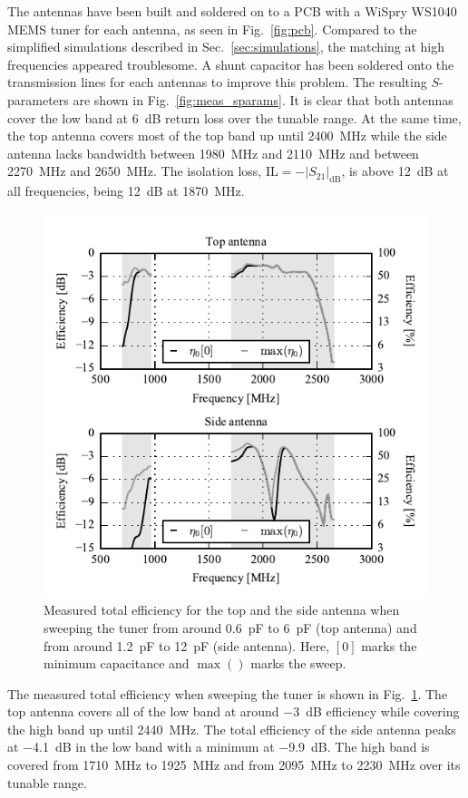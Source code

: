 The antennas have been built and soldered on to a PCB with a WiSpry WS1040 MEMS tuner for each antenna, as seen in Fig.~\ref{fig:pcb}. Compared to the simplified simulations described in Sec.~\ref{sec:simulations}, the matching at high frequencies appeared troublesome. A shunt capacitor has been soldered onto the transmission lines for each antennas to improve this problem. 
The resulting $S$-parameters are shown in Fig.~\ref{fig:meas_sparams}. It is clear that both antennas cover the low band at \SI{6}{dB} return loss over the tunable range. At the same time, the top antenna covers most of the top band up until \SI{2400}{MHz} while the side antenna lacks bandwidth between \SI{1980}{MHz} and \SI{2110}{MHz} and between \SI{2270}{MHz} and \SI{2650}{MHz}. The isolation loss, $\text{IL}=-|S_{21}|_{\text{dB}}$, is above \SI{12}{dB} at all frequencies, being \SI{12}{dB} at \SI{1870}{MHz}.

\begin{figure}[tb]
    \centering
    \includegraphics{img/meas/efficiency}
    \caption{Measured total efficiency for the top and the side antenna when sweeping the tuner from around \SI{0.6}{pF} to \SI{6}{pF} (top antenna) and from around \SI{1.2}{pF} to \SI{12}{pF} (side antenna). Here, $[0]$ marks the minimum capacitance and $\max()$ marks the sweep.}
    \label{fig:meas_eff}
\end{figure}

The measured total efficiency when sweeping the tuner is shown in Fig.~\ref{fig:meas_eff}. The top antenna covers all of the low band at around \SI{-3}{dB} efficiency while covering the high band up until \SI{2440}{MHz}. The total efficiency of the side antenna peaks at \SI{-4.1}{dB} in the low band with a minimum at \SI{-9.9}{dB}. The high band is covered from \SI{1710}{MHz} to \SI{1925}{MHz} and from \SI{2095}{MHz} to \SI{2230}{MHz} over its tunable range.

